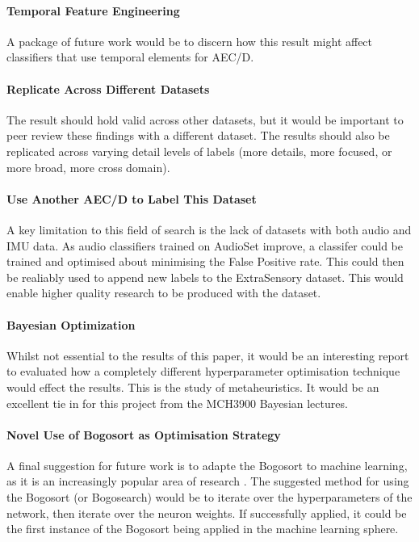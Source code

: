 \documentclass{UoNMCHA}
\numberwithin{equation}{section}
\begin{document}
\paragraph{Temporal Feature Engineering}
A package of future work would be to discern how this result might affect classifiers that use temporal elements for AEC/D.

\paragraph{Replicate Across Different Datasets}
The result should hold valid across other datasets, but it would be important to peer review these findings with a different dataset. The results should also be replicated across varying detail levels of labels (more details, more focused, or more broad, more cross domain).

\paragraph{Use Another AEC/D to Label This Dataset}
A key limitation to this field of search is the lack of datasets with both audio and IMU data. As audio classifiers trained on AudioSet improve, a classifer could be trained and optimised about minimising the False Positive rate. This could then be realiably used to append new labels to the ExtraSensory dataset. This would enable higher quality research to be produced with the dataset.

\paragraph{Bayesian Optimization}
Whilst not essential to the results of this paper, it would be an interesting report to evaluated how a completely different hyperparameter optimisation technique would effect the results. This is the study of metaheuristics. It would be an excellent tie in for this project from the MCH3900 Bayesian lectures.

\paragraph{Novel Use of Bogosort as Optimisation Strategy}
A final suggestion for future work is to adapte the Bogosort to machine learning, as it is an increasingly popular area of research \cite{Bogo_Gruber2007}\cite{Bogo_max}\cite{Bogo_Holzer2018}. The suggested method for using the Bogosort (or Bogosearch) would be to iterate over the hyperparameters of the network, then iterate over the neuron weights. If successfully applied, it could be the first instance of the Bogosort being applied in the machine learning sphere.
\newpage 
\end{document}
